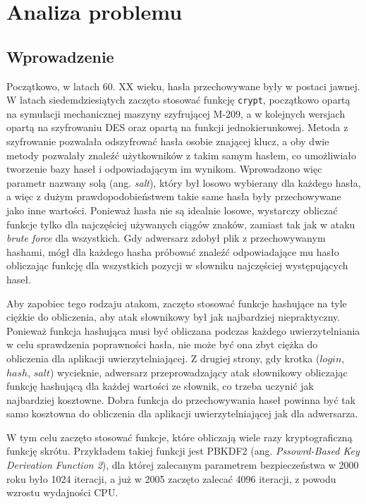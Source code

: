 \chapter{Analiza problemu}
\thispagestyle{chapterBeginStyle}
\label{rozdzial1}

\section{Wprowadzenie}

Początkowo, w latach 60. XX wieku, hasła przechowywane były w postaci jawnej.
W latach siedemdziesiątych zaczęto stosować funkcję \texttt{crypt}, początkowo opartą na symulacji mechanicznej maszyny szyfrującej M-209, a w kolejnych wersjach opartą na szyfrowaniu DES oraz opartą na funkcji jednokierunkowej. Metoda z szyfrowanie pozwalała odszyfrować hasła osobie znającej klucz, a oby dwie metody pozwalały znaleźć użytkowników z takim samym hasłem, co umożliwiało tworzenie bazy haseł i odpowiadającym im wynikom.
Wprowadzono więc parametr nazwany solą (ang. \textit{salt}), który był losowo wybierany dla każdego hasła, a więc z dużym prawdopodobieństwem takie same hasła były przechowywane jako inne wartości.
Ponieważ hasła nie są idealnie losowe, wystarczy obliczać funkcje tylko dla najczęściej używanych ciągów znaków, zamiast tak jak w ataku \textit{brute force} dla wszystkich.
Gdy adwersarz zdobył plik z przechowywanym hashami, mógł dla każdego hasha próbować znaleźć odpowiadające mu hasło obliczając funkcję dla wszystkich pozycji w słowniku najczęściej występujących haseł.

Aby zapobiec tego rodzaju atakom, zaczęto stosować funkcje hashujące na tyle ciężkie do obliczenia, aby atak słownikowy był jak najbardziej niepraktyczny. 
Ponieważ funkcja hashująca musi być obliczana podczas każdego uwierzytelniania w celu sprawdzenia poprawności hasła, nie może być ona zbyt ciężka do obliczenia dla aplikacji uwierzytelniającej.
Z drugiej strony, gdy krotka ($login$, $hash$, $salt$) wycieknie, adwersarz przeprowadzający atak słownikowy obliczając funkcję hashującą dla każdej wartości ze słownik, co trzeba uczynić jak najbardziej kosztowne.
Dobra funkcja do przechowywania haseł powinna być tak samo kosztowna do obliczenia dla aplikacji uwierzytelniającej jak dla adwersarza.

W tym celu zaczęto stosować funkcje, które obliczają wiele razy kryptograficzną funkcję skrótu. Przykładem takiej funkcji jest PBKDF2 \cite{pbkdf2} (ang. \textit{Pssowrd-Based Key Derivation Function 2}), dla której zalecanym parametrem bezpieczeństwa w 2000 roku było 1024 iteracji, a już w 2005 zaczęto zalecać 4096 iteracji, z powodu wzrostu wydajności CPU.

